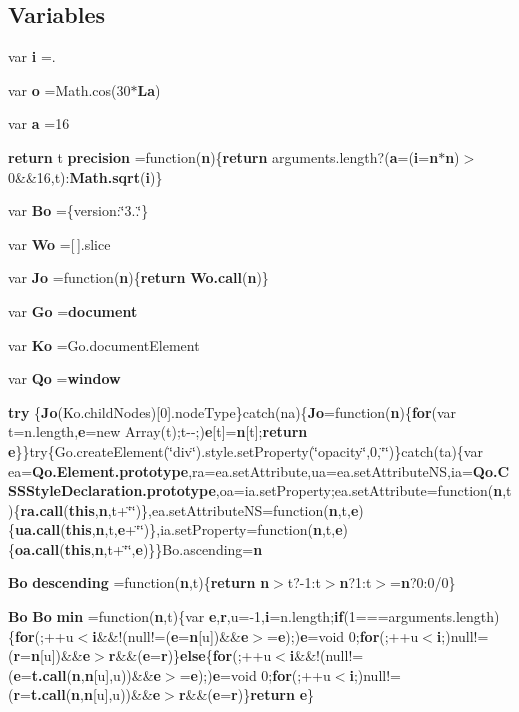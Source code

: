 \subsection*{Variables}
\begin{DoxyCompactItemize}
\item 
var {\bf i} =.
\item 
var {\bf o} =Math.\+cos(30$\ast${\bf La})
\item 
var {\bf a} =16
\item 
{\bf return} t {\bf precision} =function({\bf n})\{{\bf return} arguments.\+length?({\bf a}=({\bf i}={\bf n}$\ast${\bf n})$>$0\&\&16,t)\+:{\bf Math.\+sqrt}({\bf i})\}
\item 
var {\bf Bo} =\{version\+:\char`\"{}3..\char`\"{}\}
\item 
var {\bf Wo} =[$\,$].slice
\item 
var {\bf Jo} =function({\bf n})\{{\bf return} {\bf Wo.\+call}({\bf n})\}
\item 
var {\bf Go} ={\bf document}
\item 
var {\bf Ko} =Go.\+document\+Element
\item 
var {\bf Qo} ={\bf window}
\item 
{\bf try} \{{\bf Jo}(Ko.\+child\+Nodes)[0].node\+Type\}catch(na)\{{\bf Jo}=function({\bf n})\{{\bf for}(var t=n.\+length,{\bf e}=new Array(t);t-\/-\/;){\bf e}[t]={\bf n}[t];{\bf return} {\bf e}\}\}try\{Go.\+create\+Element(\char`\"{}div\char`\"{}).style.\+set\+Property(\char`\"{}opacity\char`\"{},0,\char`\"{}\char`\"{})\}catch(ta)\{var ea={\bf Qo.\+Element.\+prototype},ra=ea.\+set\+Attribute,ua=ea.\+set\+Attribute\+N\+S,ia={\bf Qo.\+C\+S\+S\+Style\+Declaration.\+prototype},oa=ia.\+set\+Property;ea.\+set\+Attribute=function({\bf n},t)\{{\bf ra.\+call}({\bf this},{\bf n},t+\char`\"{}\char`\"{})\},ea.\+set\+Attribute\+N\+S=function({\bf n},t,{\bf e})\{{\bf ua.\+call}({\bf this},{\bf n},t,{\bf e}+\char`\"{}\char`\"{})\},ia.\+set\+Property=function({\bf n},t,{\bf e})\{{\bf oa.\+call}({\bf this},{\bf n},t+\char`\"{}\char`\"{},{\bf e})\}\}Bo.\+ascending={\bf n}
\item 
{\bf Bo} {\bf descending} =function({\bf n},t)\{{\bf return} {\bf n}$>$t?-\/1\+:t$>${\bf n}?1\+:t$>$={\bf n}?0\+:0/0\}
\item 
{\bf Bo} {\bf Bo} {\bf min} =function({\bf n},t)\{var {\bf e},{\bf r},u=-\/1,{\bf i}=n.\+length;{\bf if}(1===arguments.\+length)\{{\bf for}(;++u$<${\bf i}\&\&!(null!=({\bf e}={\bf n}[u])\&\&{\bf e}$>$={\bf e});){\bf e}=void 0;{\bf for}(;++u$<${\bf i};)null!=({\bf r}={\bf n}[u])\&\&{\bf e}$>${\bf r}\&\&({\bf e}={\bf r})\}{\bf else}\{{\bf for}(;++u$<${\bf i}\&\&!(null!=({\bf e}={\bf t.\+call}({\bf n},{\bf n}[u],u))\&\&{\bf e}$>$={\bf e});){\bf e}=void 0;{\bf for}(;++u$<${\bf i};)null!=({\bf r}={\bf t.\+call}({\bf n},{\bf n}[u],u))\&\&{\bf e}$>${\bf r}\&\&({\bf e}={\bf r})\}{\bf return} {\bf e}\}

\end{DoxyCompactItemize}

